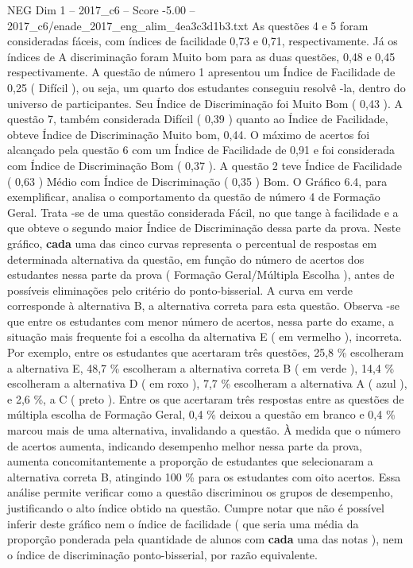 \begin{textsample}{NEG Dim 1 – 2017\_c6 – Score -5.00 – 2017\_c6/enade\_2017\_eng\_alim\_4ea3c3d1b3.txt}
As questões 4 e 5 foram consideradas fáceis, com índices de facilidade 0,73 e 0,71, respectivamente.
Já os índices de A discriminação foram Muito bom para as duas questões, 0,48 e 0,45 respectivamente.
A questão de número 1 apresentou um Índice de Facilidade de 0,25 ( Difícil ), ou seja, um quarto dos estudantes conseguiu resolvê -la, dentro do universo de participantes.
Seu Índice de Discriminação foi Muito Bom ( 0,43 ).
A questão 7, também considerada Difícil ( 0,39 ) quanto ao Índice de Facilidade, obteve Índice de Discriminação Muito bom, 0,44.
O máximo de acertos foi alcançado pela questão 6 com um Índice de Facilidade de 0,91 e foi considerada com Índice de Discriminação Bom ( 0,37 ).
A questão 2 teve Índice de Facilidade ( 0,63 ) Médio com Índice de Discriminação ( 0,35 ) Bom.
O Gráfico 6.4, para exemplificar, analisa o comportamento da questão de número 4 de Formação Geral.
Trata -se de uma questão considerada Fácil, no que tange à facilidade e a que obteve o segundo maior Índice de Discriminação dessa parte da prova.
Neste gráfico, \textbf{cada} uma das cinco curvas representa o percentual de respostas em determinada alternativa da questão, em função do número de acertos dos estudantes nessa parte da prova ( Formação Geral/Múltipla Escolha ), antes de possíveis eliminações pelo critério do ponto-bisserial.
A curva em verde corresponde à alternativa B, a alternativa correta para esta questão.
Observa -se que entre os estudantes com menor número de acertos, nessa parte do exame, a situação mais frequente foi a escolha da alternativa E ( em vermelho ), incorreta.
Por exemplo, entre os estudantes que acertaram três questões, 25,8 \% escolheram a alternativa E, 48,7 \% escolheram a alternativa correta B ( em verde ), 14,4 \% escolheram a alternativa D ( em roxo ), 7,7 \% escolheram a alternativa A ( azul ), e 2,6 \%, a C ( preto ).
Entre os que acertaram três respostas entre as questões de múltipla escolha de Formação Geral, 0,4 \% deixou a questão em branco e 0,4 \% marcou mais de uma alternativa, invalidando a questão.
À medida que o número de acertos aumenta, indicando desempenho melhor nessa parte da prova, aumenta concomitantemente a proporção de estudantes que selecionaram a alternativa correta B, atingindo 100 \% para os estudantes com oito acertos.
Essa análise permite verificar como a questão discriminou os grupos de desempenho, justificando o alto índice obtido na questão.
Cumpre notar que não é possível inferir deste gráfico nem o índice de facilidade ( que seria uma média da proporção ponderada pela quantidade de alunos com \textbf{cada} uma das notas ), nem o índice de discriminação ponto-bisserial, por razão equivalente.

\end{textsample}
